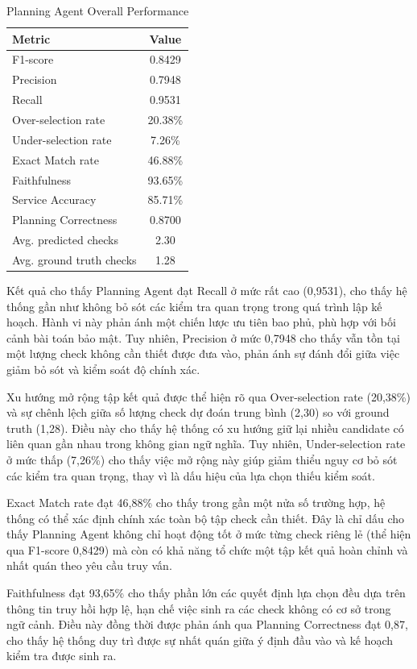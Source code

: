 \begin{table}[!htb]
\centering
\caption{Planning Agent Overall Performance}
\label{tab:planning_overall}
\begin{tabular}{l c}
\hline
\textbf{Metric} & \textbf{Value} \\
\hline
F1-score & 0.8429 \\
Precision & 0.7948 \\
Recall & 0.9531 \\
Over-selection rate & 20.38\% \\
Under-selection rate & 7.26\% \\
Exact Match rate & 46.88\% \\
Faithfulness & 93.65\% \\
Service Accuracy & 85.71\% \\
Planning Correctness & 0.8700 \\
Avg. predicted checks & 2.30 \\
Avg. ground truth checks & 1.28 \\
\hline
\end{tabular}
\end{table}

Kết quả cho thấy Planning Agent đạt Recall ở mức rất cao (0{,}9531), cho thấy hệ thống gần như không bỏ sót các kiểm tra quan trọng trong quá trình lập kế hoạch. Hành vi này phản ánh một chiến lược ưu tiên bao phủ, phù hợp với bối cảnh bài toán bảo mật. Tuy nhiên, Precision ở mức 0{,}7948 cho thấy vẫn tồn tại một lượng check không cần thiết được đưa vào, phản ánh sự đánh đổi giữa việc giảm bỏ sót và kiểm soát độ chính xác.

Xu hướng mở rộng tập kết quả được thể hiện rõ qua Over-selection rate (20{,}38\%) và sự chênh lệch giữa số lượng check dự đoán trung bình (2{,}30) so với ground truth (1{,}28). Điều này cho thấy hệ thống có xu hướng giữ lại nhiều candidate có liên quan gần nhau trong không gian ngữ nghĩa. Tuy nhiên, Under-selection rate ở mức thấp (7{,}26\%) cho thấy việc mở rộng này giúp giảm thiểu nguy cơ bỏ sót các kiểm tra quan trọng, thay vì là dấu hiệu của lựa chọn thiếu kiểm soát.

Exact Match rate đạt 46{,}88\% cho thấy trong gần một nửa số trường hợp, hệ thống có thể xác định chính xác toàn bộ tập check cần thiết. Đây là chỉ dấu cho thấy Planning Agent không chỉ hoạt động tốt ở mức từng check riêng lẻ (thể hiện qua F1-score 0{,}8429) mà còn có khả năng tổ chức một tập kết quả hoàn chỉnh và nhất quán theo yêu cầu truy vấn.

Faithfulness đạt 93{,}65\% cho thấy phần lớn các quyết định lựa chọn đều dựa trên thông tin truy hồi hợp lệ, hạn chế việc sinh ra các check không có cơ sở trong ngữ cảnh. Điều này đồng thời được phản ánh qua Planning Correctness đạt 0{,}87, cho thấy hệ thống duy trì được sự nhất quán giữa ý định đầu vào và kế hoạch kiểm tra được sinh ra.


